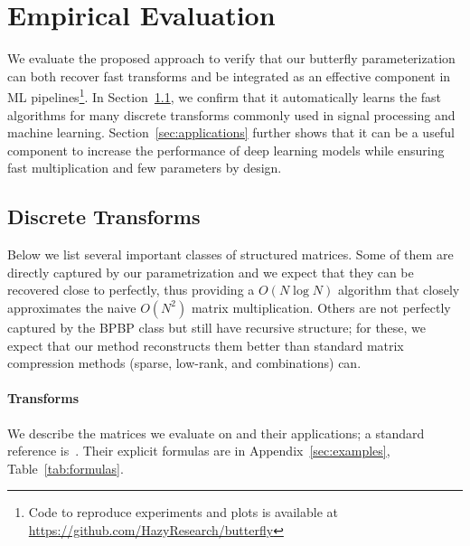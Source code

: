 \section{Empirical Evaluation}

We evaluate the proposed approach to verify that our butterfly parameterization can both recover fast transforms and be integrated as an effective component in ML pipelines\footnote{Code to reproduce experiments and plots is available at \small{\url{https://github.com/HazyResearch/butterfly}}}.
In Section~\ref{sec:learning_fast_transforms}, we confirm that it automatically learns the fast algorithms for many discrete transforms commonly used in signal processing and machine learning.
Section~\ref{sec:applications} further shows that it can be a useful component to increase the performance of deep learning models while ensuring fast multiplication and few parameters by design.

\subsection{Discrete Transforms}
\label{sec:learning_fast_transforms}

Below we list several important classes of structured matrices. Some of them are directly captured by our parametrization and we expect that they can be recovered close to perfectly, thus providing a $O(N \log N)$ algorithm that closely approximates the naive $O(N^2)$ matrix multiplication. Others are not perfectly captured by the BPBP class but still have recursive structure; for these, we expect that our method reconstructs them better than standard matrix compression methods (sparse, low-rank, and combinations) can.

\paragraph{Transforms}
We describe the matrices we evaluate on and their applications; a standard reference is~\citet{proakis2001digital}.
Their explicit formulas are in Appendix~\ref{sec:examples}, Table~\ref{tab:formulas}.

